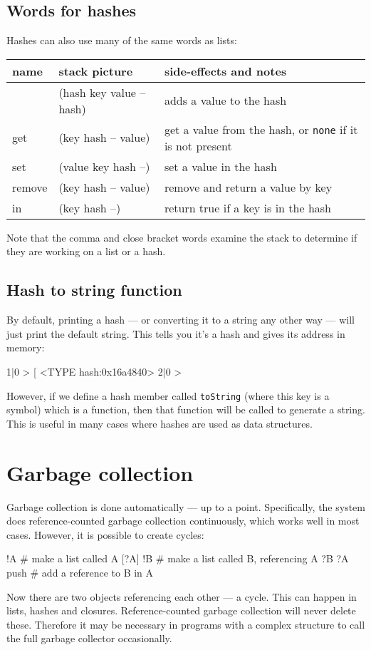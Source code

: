 \subsection{Words for hashes}
Hashes can also use many of the same words as lists:
\begin{center}
\begin{tabular}{|l|l|p{4in}|}\hline
\textbf{name} & \textbf{stack picture} & \textbf{side-effects and notes}\\ \hline
[\%    & (-- hash)    & creates a new hash\\
,    & (hash key value -- hash) & adds a value to the hash\\
]    & (hash key value -- hash) & adds a value to the hash\\
get & (key hash -- value) & get a value from the hash, or \texttt{none} if it is not present\\
set & (value key hash --) & set a value in the hash\\
remove & (key hash -- value) & remove and return a value by key\\
in & (key hash --) & return true if a key is in the hash\\
\hline
\end{tabular}
\end{center}
Note that the comma and close bracket words examine the stack to
determine if they are working on a list or a hash.

\subsection{Hash to string function}
By default, printing a hash --- or converting it to a string any other way ---
will just print the default string. This tells you it's a hash and gives
its address in memory:
\begin{v}
1|0 > [%
<TYPE hash:0x16a4840>
2|0 > 
\end{v}
However, if we define a hash member called \verb+toString+ (where this
key is a symbol) which is a function, then that function will be called
to generate a string. This is useful in many cases where hashes are used
as data structures.

\section{Garbage collection}
Garbage collection is done automatically --- up to a point. Specifically,
the system does reference-counted garbage collection continuously,
which works well in most cases. However, it is possible to
create cycles:
\begin{v}
    [] !A              # make a list called A
    [?A] !B            # make a list called B, referencing A
    ?B ?A push         # add a reference to B in A
\end{v}
Now there are two objects referencing each other --- a cycle. This can
happen in lists, hashes and closures. Reference-counted garbage
collection will never delete these. Therefore it may be necessary
in programs with a complex structure to call the full garbage collector
occasionally.

